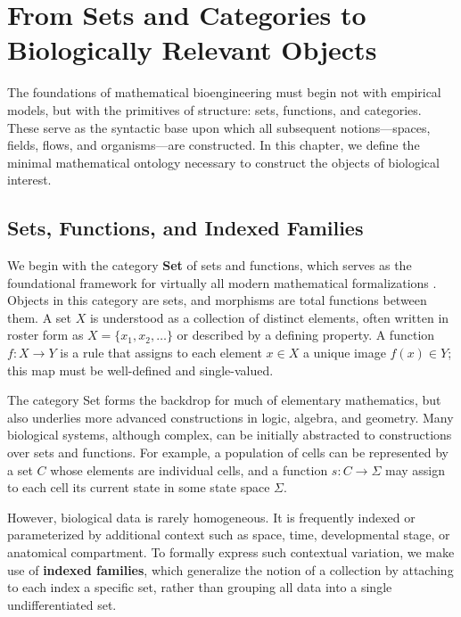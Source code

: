 
\newpage
\section[From Sets and Categories to Biologically Relevant Objects]{From Sets and Categories to \\ Biologically Relevant Objects}

The foundations of mathematical bioengineering must begin not with empirical models, but with the primitives of structure: sets, functions, and categories. These serve as the syntactic base upon which all subsequent notions---spaces, fields, flows, and organisms---are constructed. In this chapter, we define the minimal mathematical ontology necessary to construct the objects of biological interest.

\subsection{Sets, Functions, and Indexed Families}

We begin with the category \textbf{\textsf{Set}} of sets and functions, which serves as the foundational framework for virtually all modern mathematical formalizations \cite{maclane_categories_2010}. Objects in this category are sets, and morphisms are total functions between them. A set $X$ is understood as a collection of distinct elements, often written in roster form as $X = \{x_1, x_2, \dots\}$ or described by a defining property. A function $f : X \to Y$ is a rule that assigns to each element $x \in X$ a unique image $f(x) \in Y$; this map must be well-defined and single-valued.

The category \textsf{Set} forms the backdrop for much of elementary mathematics, but also underlies more advanced constructions in logic, algebra, and geometry. Many biological systems, although complex, can be initially abstracted to constructions over sets and functions. For example, a population of cells can be represented by a set $C$ whose elements are individual cells, and a function $s : C \to \Sigma$ may assign to each cell its current state in some state space $\Sigma$.

However, biological data is rarely homogeneous. It is frequently indexed or parameterized by additional context such as space, time, developmental stage, or anatomical compartment. To formally express such contextual variation, we make use of \textbf{indexed families}, which generalize the notion of a collection by attaching to each index a specific set, rather than grouping all data into a single undifferentiated set.

